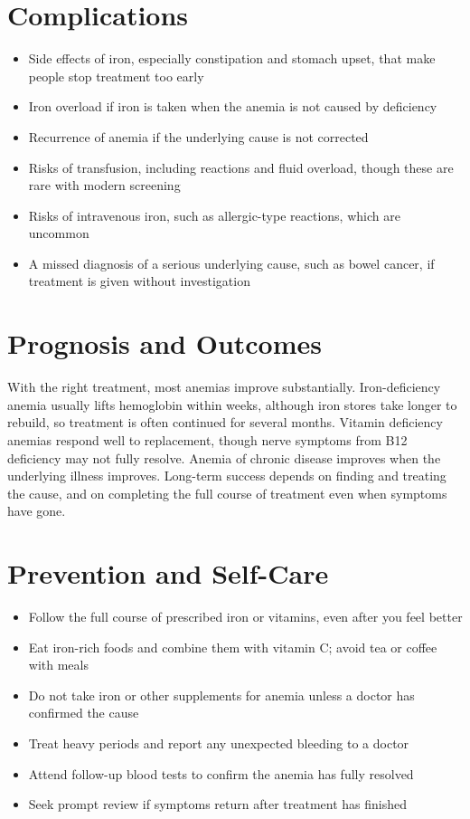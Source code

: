 \section*{Complications}
\begin{itemize}
    \item Side effects of iron, especially constipation and stomach upset, that make people stop treatment too early
    \item Iron overload if iron is taken when the anemia is not caused by deficiency
    \item Recurrence of anemia if the underlying cause is not corrected
    \item Risks of transfusion, including reactions and fluid overload, though these are rare with modern screening
    \item Risks of intravenous iron, such as allergic-type reactions, which are uncommon
    \item A missed diagnosis of a serious underlying cause, such as bowel cancer, if treatment is given without investigation
\end{itemize}

\section*{Prognosis and Outcomes}
With the right treatment, most anemias improve substantially. Iron-deficiency anemia usually lifts hemoglobin within weeks, although iron stores take longer to rebuild, so treatment is often continued for several months. Vitamin deficiency anemias respond well to replacement, though nerve symptoms from B12 deficiency may not fully resolve. Anemia of chronic disease improves when the underlying illness improves. Long-term success depends on finding and treating the cause, and on completing the full course of treatment even when symptoms have gone.

\section*{Prevention and Self-Care}
\begin{itemize}
    \item Follow the full course of prescribed iron or vitamins, even after you feel better
    \item Eat iron-rich foods and combine them with vitamin C; avoid tea or coffee with meals
    \item Do not take iron or other supplements for anemia unless a doctor has confirmed the cause
    \item Treat heavy periods and report any unexpected bleeding to a doctor
    \item Attend follow-up blood tests to confirm the anemia has fully resolved
    \item Seek prompt review if symptoms return after treatment has finished
\end{itemize}

